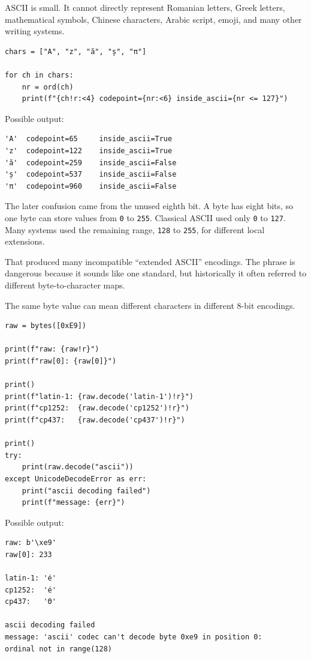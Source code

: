 ASCII is small. It cannot directly represent Romanian letters, Greek letters, mathematical symbols, Chinese characters, Arabic script, emoji, and many other writing systems.

\begin{verbatim}
chars = ["A", "z", "ă", "ș", "π"]

for ch in chars:
    nr = ord(ch)
    print(f"{ch!r:<4} codepoint={nr:<6} inside_ascii={nr <= 127}")
\end{verbatim}

Possible output:

\begin{verbatim}
'A'  codepoint=65     inside_ascii=True
'z'  codepoint=122    inside_ascii=True
'ă'  codepoint=259    inside_ascii=False
'ș'  codepoint=537    inside_ascii=False
'π'  codepoint=960    inside_ascii=False
\end{verbatim}

The later confusion came from the unused eighth bit. A byte has eight bits, so one byte can store values from \texttt{0} to \texttt{255}. Classical ASCII used only \texttt{0} to \texttt{127}. Many systems used the remaining range, \texttt{128} to \texttt{255}, for different local extensions.

That produced many incompatible ``extended ASCII'' encodings. The phrase is dangerous because it sounds like one standard, but historically it often referred to different byte-to-character maps.

The same byte value can mean different characters in different 8-bit encodings.

\begin{verbatim}
raw = bytes([0xE9])

print(f"raw: {raw!r}")
print(f"raw[0]: {raw[0]}")

print()
print(f"latin-1: {raw.decode('latin-1')!r}")
print(f"cp1252:  {raw.decode('cp1252')!r}")
print(f"cp437:   {raw.decode('cp437')!r}")

print()
try:
    print(raw.decode("ascii"))
except UnicodeDecodeError as err:
    print("ascii decoding failed")
    print(f"message: {err}")
\end{verbatim}

Possible output:

\begin{verbatim}
raw: b'\xe9'
raw[0]: 233

latin-1: 'é'
cp1252:  'é'
cp437:   'Θ'

ascii decoding failed
message: 'ascii' codec can't decode byte 0xe9 in position 0:
ordinal not in range(128)
\end{verbatim}

